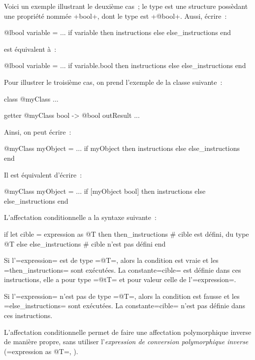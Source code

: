 Voici un exemple illustrant le deuxième cas~; le type  est une structure possèdant une propriété nommée \ggsq+bool+, dont le type est \ggsq+@bool+. Aussi, écrire~:

\begin{galgas4}
@lbool variable = ...
if variable then
  instructions
else
  else_instructions
end
\end{galgas4}


est équivalent à~:
\begin{galgas4}
@lbool variable = ...
if variable.bool then
  instructions
else
  else_instructions
end
\end{galgas4}


Pour illustrer le troisième cas, on prend l'exemple de la classe suivante~:
\begin{galgas4}
class @myClass { ... }

getter @myClass bool -> @bool outResult { ... }
\end{galgas4}

Ainsi, on peut écrire~:
\begin{galgas4}
@myClass myObject = ...
if myObject then
  instructions
else
  else_instructions
end
\end{galgas4}


Il est équivalent d'écrire~:
\begin{galgas4}
@myClass myObject = ...
if [myObject bool] then
  instructions
else
  else_instructions
end
\end{galgas4}



L'affectation conditionnelle a la syntaxe suivante~:
\begin{galgas4}
if let cible = expression as @T then
  then_instructions # cible est défini, du type @T
else
  else_instructions # cible n'est pas défini
end
\end{galgas4}

Si l'\ggsq=expression= est de type \ggsq=@T=, alors la condition est vraie et les \ggsq=then_instructions= sont exécutées. La constante\ggsq=cible= est définie dans ces instructions, elle a pour type \ggsq=@tT= et pour valeur celle de l'\ggsq=expression=.

Si l'\ggsq=expression= n'est pas de type \ggsq=@T=, alors la condition est fausse et les \ggsq=else_instructions= sont exécutées. La constante\ggsq=cible= n'est pas définie dans ces instructions.

L'affectation conditionnelle permet de faire une affectation polymorphique inverse de manière propre, sans utiliser l'\emph{expression de conversion polymorphique inverse} (\ggsq=expression as @T=, ).



